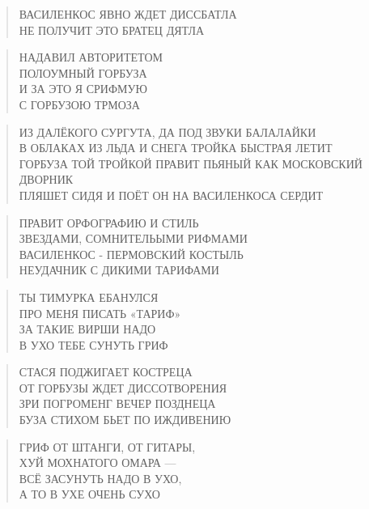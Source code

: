 \poemtitle{***}
\begin{verse}
ВАСИЛЕНКОС ЯВНО ЖДЕТ ДИССБАТЛА\\
НЕ ПОЛУЧИТ ЭТО БРАТЕЦ ДЯТЛА
\end{verse}

\poemtitle{***}
\begin{verse}
НАДАВИЛ АВТОРИТЕТОМ\\
ПОЛОУМНЫЙ ГОРБУЗА\\
И ЗА ЭТО Я СРИФМУЮ\\
С ГОРБУЗОЮ ТРМОЗА
\end{verse}

\poemtitle{***}
\begin{verse}
ИЗ ДАЛЁКОГО СУРГУТА, ДА ПОД ЗВУКИ БАЛАЛАЙКИ\\
В ОБЛАКАХ ИЗ ЛЬДА И СНЕГА ТРОЙКА БЫСТРАЯ ЛЕТИТ\\
ГОРБУЗА ТОЙ ТРОЙКОЙ ПРАВИТ ПЬЯНЫЙ КАК МОСКОВСКИЙ ДВОРНИК\\
ПЛЯШЕТ СИДЯ И ПОЁТ ОН НА ВАСИЛЕНКОСА СЕРДИТ
\end{verse}

\poemtitle{***}
\begin{verse}
ПРАВИТ ОРФОГРАФИЮ И СТИЛЬ\\
ЗВЕЗДАМИ, СОМНИТЕЛЬЫМИ РИФМАМИ\\
ВАСИЛЕНКОС - ПЕРМОВСКИЙ КОСТЫЛЬ\\
НЕУДАЧНИК С ДИКИМИ ТАРИФАМИ
\end{verse}

\poemtitle{***}
\begin{verse}
ТЫ ТИМУРКА ЕБАНУЛСЯ\\
ПРО МЕНЯ ПИСАТЬ «ТАРИФ»\\
ЗА ТАКИЕ ВИРШИ НАДО\\
В УХО ТЕБЕ СУНУТЬ ГРИФ
\end{verse}

\poemtitle{***}
\begin{verse}
СТАСЯ ПОДЖИГАЕТ КОСТРЕЦА\\
ОТ ГОРБУЗЫ ЖДЕТ ДИССОТВОРЕНИЯ\\
ЗРИ ПОГРОМЕНГ ВЕЧЕР ПОЗДНЕЦА\\
БУЗА СТИХОМ БЬЕТ ПО ИЖДИВЕНИЮ
\end{verse}

\poemtitle{***}
\begin{verse}
ГРИФ ОТ ШТАНГИ, ОТ ГИТАРЫ,\\
ХУЙ МОХНАТОГО ОМАРА —\\
ВСЁ ЗАСУНУТЬ НАДО В УХО,\\
А ТО В УХЕ ОЧЕНЬ СУХО
\end{verse}

